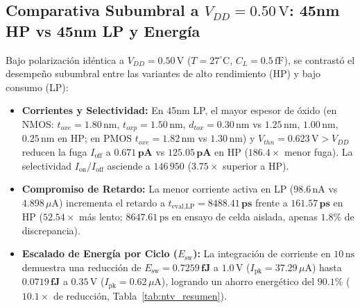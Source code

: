 \subsection{Comparativa Subumbral a \texorpdfstring{$V_{DD} = 0.50\,\text{V}$}{VDD = 0.50 V}: 45nm HP vs 45nm LP y Energía}
Bajo polarización idéntica a $V_{DD} = 0.50\,\text{V}$ ($T=27^\circ\text{C}$, $C_L=0.5\,\text{fF}$), se contrastó el desempeño subumbral entre las variantes de alto rendimiento (HP) y bajo consumo (LP):

\begin{itemize}[leftmargin=1.4em,itemsep=0.01em]
  \item \textbf{Corrientes y Selectividad:} En 45nm LP, el mayor espesor de óxido (en NMOS: $t_{oxe} = 1.80\,\text{nm}$, $t_{oxp}=1.50\,\text{nm}$, $d_{tox}=0.30\,\text{nm}$ vs $1.25\,\text{nm}$, $1.00\,\text{nm}$, $0.25\,\text{nm}$ en HP; en PMOS $t_{oxe}=1.82\,\text{nm}$ vs $1.30\,\text{nm}$) y $V_{thn} = 0.623\,\text{V} > V_{DD}$ reducen la fuga $I_{\text{off}}$ a $\mathbf{0.671\,\text{pA}}$ vs $\mathbf{125.05\,\text{pA}}$ en HP ($\mathbf{186.4\times}$ menor fuga). La selectividad $I_{\text{on}}/I_{\text{off}}$ asciende a $146\,950$ ($3.75\times$ superior a HP).
  \item \textbf{Compromiso de Retardo:} La menor corriente activa en LP ($98.6\,\text{nA}$ vs $4.898\,\mu\text{A}$) incrementa el retardo a $t_{\text{eval,LP}} = \mathbf{8488.41\,\text{ps}}$ frente a $\mathbf{161.57\,\text{ps}}$ en HP ($\mathbf{52.54\times}$ más lento; $8647.61\,\text{ps}$ en ensayo de celda aislada, apenas $1.8\%$ de discrepancia).
  \item \textbf{Escalado de Energía por Ciclo ($E_{\text{sw}}$):} La integración de corriente en $10\,\text{ns}$ demuestra una reducción de $E_{\text{sw}} = \mathbf{0.7259\,\text{fJ}}$ a $1.0\,\text{V}$ ($I_{\text{pk}} = 37.29\,\mu\text{A}$) hasta $\mathbf{0.0719\,\text{fJ}}$ a $0.35\,\text{V}$ ($I_{\text{pk}} = 0.62\,\mu\text{A}$), logrando un ahorro energético del $\mathbf{90.1\%}$ ($\mathbf{10.1\times}$ de reducción, Tabla~\ref{tab:ntv_resumen}).
\end{itemize}

